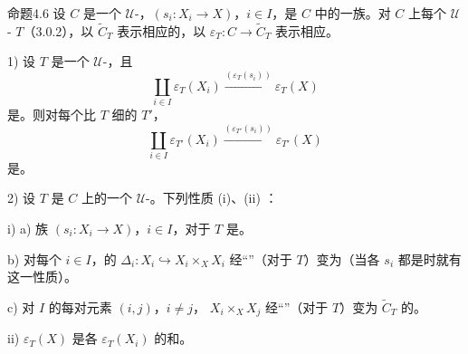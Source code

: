 \begin{SGAresult}{命题}{4.6}
设 $C$ 是一个 $\mathcal U$-，$(s_i:X_i\to X)$，$i\in I$，是 $C$ 中的一族。对 $C$ 上每个 $\mathcal U$- $T$（3.0.2），以 $\widetilde C_T$ 表示相应的，以 $\varepsilon_T:C\to\widetilde C_T$ 表示相应。
\par 1) 设 $T$ 是一个 $\mathcal U$-，且
\[\coprod_{i\in I}\varepsilon_T(X_i)\xrightarrow{(\varepsilon_T(s_i))}\varepsilon_T(X)\]
是。则对每个比 $T$ 细的 $T'$，
\[\coprod_{i\in I}\varepsilon_{T'}(X_i)\xrightarrow{(\varepsilon_{T'}(s_i))}\varepsilon_{T'}(X)\]
是。
\par 2) 设 $T$ 是 $C$ 上的一个 $\mathcal U$-。下列性质 (i)、(ii) ：
\par i) a) 族 $(s_i:X_i\to X)$，$i\in I$，对于 $T$ 是。
\par b) 对每个 $i\in I$，的 $\Delta_i:X_i\hookrightarrow X_i\times_XX_i$ 经“”（对于 $T$）变为（当各 $s_i$ 都是时就有这一性质）。
\par c) 对 $I$ 的每对元素 $(i,j)$，$i\ne j$， $X_i\times_XX_j$ 经“”（对于 $T$）变为 $\widetilde C_T$ 的。
\par ii) $\varepsilon_T(X)$ 是各 $\varepsilon_T(X_i)$ 的和。
\end{SGAresult}
